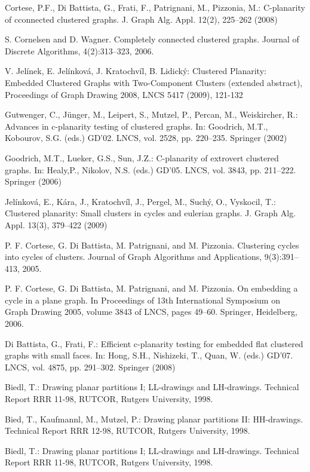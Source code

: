 \documentclass[12pt,a4report]{report}
\theoremstyle{definition}
\begin{document}

\begin{thebibliography}{9}

	Cortese, P.F., Di Battista, G., Frati, F., Patrignani, M., Pizzonia, M.: C-planarity of cconnected clustered graphs. J. Graph Alg. Appl. 12(2), 225–262 (2008)

	S. Cornelsen and D. Wagner. Completely connected clustered graphs. Journal of Discrete Algorithms, 4(2):313–323, 2006.

	V. Jelínek, E. Jelínková, J. Kratochvíl, B. Lidický: Clustered Planarity: Embedded Clustered Graphs with Two-Component Clusters (extended abstract), Proceedings of Graph Drawing 2008, LNCS 5417 (2009), 121-132

	Gutwenger, C., Jünger, M., Leipert, S., Mutzel, P., Percan, M., Weiskircher, R.: Advances in c-planarity testing of clustered graphs. In: Goodrich, M.T., Kobourov, S.G. (eds.) GD’02. LNCS, vol. 2528, pp. 220–235. Springer (2002)

	Goodrich, M.T., Lueker, G.S., Sun, J.Z.: C-planarity of extrovert clustered graphs. In: Healy,P., Nikolov, N.S. (eds.) GD’05. LNCS, vol. 3843, pp. 211–222. Springer (2006)

	Jelínková, E., Kára, J., Kratochvíl, J., Pergel, M., Suchý, O., Vyskocil, T.: Clustered planarity: Small clusters in cycles and eulerian graphs. J. Graph Alg. Appl. 13(3), 379–422 (2009)

P. F. Cortese, G. Di Battista, M. Patrignani, and M. Pizzonia. Clustering cycles into cycles of clusters. Journal of Graph Algorithms and Applications,
9(3):391–413, 2005.

	P. F. Cortese, G. Di Battista, M. Patrignani, and M. Pizzonia. On embedding a cycle in a plane graph. In Proceedings of 13th International Symposium on Graph Drawing 2005, volume 3843 of LNCS, pages 49–60. Springer, Heidelberg, 2006.

	Di Battista, G., Frati, F.: Efficient c-planarity testing for embedded flat clustered graphs with small faces. In: Hong, S.H., Nishizeki, T., Quan, W. (eds.) GD’07. LNCS, vol. 4875, pp. 291–302. Springer (2008)

	Biedl, T.: Drawing planar partitions I; LL-drawings and LH-drawings. Technical Report RRR 11-98, RUTCOR, Rutgers University, 1998.

	 Bied, T., Kaufmannl, M., Mutzel, P.: Drawing planar partitions II: 
HH-drawings. Technical Report RRR 12-98, RUTCOR, Rutgers University, 1998.

	Biedl, T.: Drawing planar partitions I; LL-drawings and LH-drawings. Technical Report RRR 11-98, RUTCOR, Rutgers University, 1998.

\end{thebibliography}
\end{document}

